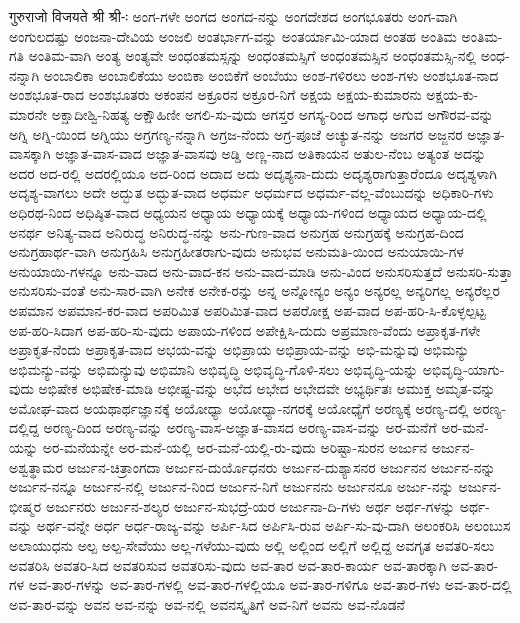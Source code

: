 गुरुराजो
विजयते
श्री
श्री-ः
ಅಂಗ-ಗಳೇ
ಅಂಗದ
ಅಂಗದ-ನನ್ನು
ಅಂಗದೇಶದ
ಅಂಗಭೂತರು
ಅಂಗ-ವಾಗಿ
ಅಂಗುಲದಷ್ಟು
ಅಂಜನಾ-ದೇವಿಯ
ಅಂಜಲಿ
ಅಂತರ್ಭಾಗ-ವನ್ನು
ಅಂತರ್ಯಾಮಿ-ಯಾದ
ಅಂತಹ
ಅಂತಿಮ
ಅಂತಿಮ-ಗತಿ
ಅಂತಿಮ-ವಾಗಿ
ಅಂತ್ಯ
ಅಂತ್ಯವೇ
ಅಂಧಂತಮಸ್ಸನ್ನು
ಅಂಧಂತಮಸ್ಸಿಗೆ
ಅಂಧಂತಮಸ್ಸಿನ
ಅಂಧಂತಮಸ್ಸಿ-ನಲ್ಲಿ
ಅಂಧ-ನನ್ನಾಗಿ
ಅಂಬಾಲಿಕಾ
ಅಂಬಾಲಿಕೆಯು
ಅಂಬಿಕಾ
ಅಂಬಿಕೆಗೆ
ಅಂಬೆಯು
ಅಂಶ-ಗಳಿರಲು
ಅಂಶ-ಗಳು
ಅಂಶಭೂತ-ನಾದ
ಅಂಶಭೂತ-ರಾದ
ಅಂಶಭೂತರು
ಅಕಂಪನ
ಅಕ್ರೂರನ
ಅಕ್ರೂರ-ನಿಗೆ
ಅಕ್ಷಯ
ಅಕ್ಷಯ-ಕುಮಾರನು
ಅಕ್ಷಯ-ಕು-ಮಾರನೇ
ಅಕ್ಷಾದೀಶ್ವಿ-ನಿಹತ್ಯ
ಅಕ್ಷೌಹಿಣೀ
ಅಗಲಿ-ಸು-ವುದು
ಅಗಸ್ತರ
ಅಗಸ್ಯ-ರಿಂದ
ಅಗಾಧ
ಅಗುವ
ಅಗೌರವ-ವನ್ನು
ಅಗ್ನಿ
ಅಗ್ನಿ-ಯಿಂದ
ಅಗ್ನಿಯು
ಅಗ್ರಗಣ್ಯ-ನನ್ನಾಗಿ
ಅಗ್ರಜ-ನೆಂದು
ಅಗ್ರ-ಪೂಜೆ
ಅಚ್ಯುತ-ನನ್ನು
ಅಜಗರ
ಅಜ್ಜನರ
ಅಜ್ಞಾತ-ವಾಸಕ್ಕಾಗಿ
ಅಜ್ಞಾತ-ವಾಸ-ವಾದ
ಅಜ್ಞಾತ-ವಾಸವು
ಅಡ್ಡಿ
ಅಣ್ಣ-ನಾದ
ಅತಿಕಾಯನ
ಅತುಲ-ನೆಂಬ
ಅತ್ಯಂತ
ಅದನ್ನು
ಅದರ
ಅದ-ರಲ್ಲಿ
ಅದರಲ್ಲಿಯೂ
ಅದ-ರಿಂದ
ಅದಾದ
ಅದು
ಅದೃಶ್ಯನಾ-ದುದು
ಅದೃಶ್ಯರಾಗುತ್ತಾರೆಂದೂ
ಅದೃಶ್ಯಳಾಗಿ
ಅದೃಶ್ಯ-ವಾಗಲು
ಅದೇ
ಅದ್ಭುತ
ಅದ್ಭುತ-ವಾದ
ಅಧರ್ಮ
ಅಧರ್ಮದ
ಅಧರ್ಮ-ವಲ್ಲ-ವೆಂಬುದನ್ನು
ಅಧಿಕಾರಿ-ಗಳು
ಅಧಿರಥ-ನಿಂದ
ಅಧಿಷ್ಠಿತ-ವಾದ
ಅಧ್ಯಯನ
ಅಧ್ಯಾಯ
ಅಧ್ಯಾಯಕ್ಕೆ
ಅಧ್ಯಾಯ-ಗಳಿಂದ
ಅಧ್ಯಾಯದ
ಅಧ್ಯಾಯ-ದಲ್ಲಿ
ಅನರ್ಥ
ಅನಿತ್ಯ-ವಾದ
ಅನಿರುದ್ಧ
ಅನಿರುದ್ಧ-ನನ್ನು
ಅನು-ಗುಣ-ವಾದ
ಅನುಗ್ರಹ
ಅನುಗ್ರಹಕ್ಕೆ
ಅನುಗ್ರಹ-ದಿಂದ
ಅನುಗ್ರಹಾರ್ಥ-ವಾಗಿ
ಅನುಗ್ರಹಿಸಿ
ಅನುಗ್ರಹೀತರಾಗು-ವುದು
ಅನುಭವ
ಅನುಮತಿ-ಯಿಂದ
ಅನುಯಾಯಿ-ಗಳ
ಅನುಯಾಯಿ-ಗಳನ್ನೂ
ಅನು-ವಾದ
ಅನು-ವಾದ-ಕನ
ಅನು-ವಾದ-ಮಾಡಿ
ಅನು-ವಿಂದ
ಅನುಸರಿಸುತ್ತದೆ
ಅನುಸರಿ-ಸುತ್ತಾ
ಅನುಸರಿಸು-ವಂತೆ
ಅನು-ಸಾರ-ವಾಗಿ
ಅನೇಕ
ಅನೇಕ-ರನ್ನು
ಅನ್ನ
ಅನ್ನೋನ್ಯಂ
ಅನ್ಯಂ
ಅನ್ಯರಲ್ಲ
ಅನ್ಯರಿಗಲ್ಲ
ಅನ್ಯರೆಲ್ಲರ
ಅಪಮಾನ
ಅಪಮಾನ-ಕರ-ವಾದ
ಅಪರಿಮಿತ
ಅಪರಿಮಿತ-ವಾದ
ಅಪರೋಕ್ಷ
ಅಪ-ವಾದ
ಅಪ-ಹರಿ-ಸಿ-ಕೊಳ್ಳಲ್ಪಟ್ಟ
ಅಪ-ಹರಿ-ಸಿದಾಗ
ಅಪ-ಹರಿ-ಸು-ವುದು
ಅಪಾಯ-ಗಳಿಂದ
ಅಪೇಕ್ಷಿಸಿ-ದುದು
ಅಪ್ರಮಾಣ-ವೆಂದು
ಅಪ್ರಾಕೃತ-ಗಳೇ
ಅಪ್ರಾಕೃತ-ನೆಂದು
ಅಪ್ರಾಕೃತ-ವಾದ
ಅಭಯ-ವನ್ನು
ಅಭಿಪ್ರಾಯ
ಅಭಿಪ್ರಾಯ-ವನ್ನು
ಅಭಿ-ಮನ್ನುವು
ಅಭಿಮನ್ಯು
ಅಭಿಮನ್ಯು-ವನ್ನು
ಅಭಿಮನ್ಯುವು
ಅಭಿಮಾನಿ
ಅಭಿವೃದ್ಧಿ
ಅಭಿವೃದ್ಧಿ-ಗೊಳಿ-ಸಲು
ಅಭಿವೃದ್ಧಿ-ಯನ್ನು
ಅಭಿವೃದ್ಧಿ-ಯಾಗು-ವುದು
ಅಭಿಷೇಕ
ಅಭಿಷೇಕ-ಮಾಡಿ
ಅಭೀಷ್ಟ-ವನ್ನು
ಅಭೆದ
ಅಭೇದ
ಅಭೇದವೇ
ಅಭ್ಯರ್ಥಿತಃ
ಅಮುಕ್ತ
ಅಮೃತ-ವನ್ನು
ಅಮೋಘ-ವಾದ
ಅಯಥಾರ್ಥಜ್ಞಾನಕ್ಕೆ
ಅಯೋಧ್ಯಾ
ಅಯೋಧ್ಯಾ-ನಗರಕ್ಕೆ
ಅಯೋಧ್ಯೆಗೆ
ಅರಣ್ಯಕ್ಕೆ
ಅರಣ್ಯ-ದಲ್ಲಿ
ಅರಣ್ಯ-ದಲ್ಲಿದ್ದ
ಅರಣ್ಯ-ದಿಂದ
ಅರಣ್ಯ-ವನ್ನು
ಅರಣ್ಯ-ವಾಸ-ಅಜ್ಞಾತ-ವಾಸದ
ಅರಣ್ಯ-ವಾಸ-ವನ್ನು
ಅರ-ಮನೆಗೆ
ಅರ-ಮನೆ-ಯನ್ನು
ಅರ-ಮನೆಯನ್ನೇ
ಅರ-ಮನೆ-ಯಲ್ಲಿ
ಅರ-ಮನೆ-ಯಲ್ಲಿ-ರು-ವುದು
ಅರಿಷ್ಟಾ-ಸುರನ
ಅರ್ಜುನ
ಅರ್ಜುನ-ಅಶ್ವತ್ಥಾಮರ
ಅರ್ಜುನ-ಚಿತ್ರಾಂಗದಾ
ಅರ್ಜುನ-ದುರ್ಯೊಧನರು
ಅರ್ಜುನ-ದುಶ್ಯಾಸನರ
ಅರ್ಜುನನ
ಅರ್ಜುನ-ನನ್ನು
ಅರ್ಜುನ-ನನ್ನೂ
ಅರ್ಜುನ-ನಲ್ಲಿ
ಅರ್ಜುನ-ನಿಂದ
ಅರ್ಜುನ-ನಿಗೆ
ಅರ್ಜುನನು
ಅರ್ಜುನನೂ
ಅರ್ಜು-ನನ್ನು
ಅರ್ಜುನ-ಭೀಷ್ಮರ
ಅರ್ಜುನರು
ಅರ್ಜುನ-ಶಲ್ಯರ
ಅರ್ಜುನ-ಸುಭದ್ರೆ-ಯರ
ಅರ್ಜುನಾ-ದಿ-ಗಳು
ಅರ್ಥ
ಅರ್ಥ-ಗಳನ್ನು
ಅರ್ಥ-ವನ್ನು
ಅರ್ಥ-ವನ್ನೇ
ಅರ್ಧ
ಅರ್ಧ-ರಾಜ್ಯ-ವನ್ನು
ಅರ್ಪಿ-ಸಿದ
ಅರ್ಪಿಸಿ-ರುವ
ಅರ್ಪಿ-ಸು-ವು-ದಾಗಿ
ಅಲಂಕರಿಸಿ
ಅಲಂಬುಸ
ಅಲಾಯುಧನು
ಅಲ್ಪ
ಅಲ್ಪ-ಸೇವೆಯು
ಅಲ್ಲ-ಗಳೆಯು-ವುದು
ಅಲ್ಲಿ
ಅಲ್ಲಿಂದ
ಅಲ್ಲಿಗೆ
ಅಲ್ಲಿದ್ದ
ಅವಗೃತ
ಅವತರಿ-ಸಲು
ಅವತರಿಸಿ
ಅವತರಿ-ಸಿದ
ಅವತರಿಸುವ
ಅವತರಿಸು-ವುದು
ಅವ-ತಾರ
ಅವ-ತಾರ-ಕಾರ್ಯ
ಅವ-ತಾರಕ್ಕಾಗಿ
ಅವ-ತಾರ-ಗಳ
ಅವ-ತಾರ-ಗಳನ್ನು
ಅವ-ತಾರ-ಗಳಲ್ಲಿ
ಅವ-ತಾರ-ಗಳಲ್ಲಿಯೂ
ಅವ-ತಾರ-ಗಳಿಗೂ
ಅವ-ತಾರ-ಗಳು
ಅವ-ತಾರ-ದಲ್ಲಿ
ಅವ-ತಾರ-ವನ್ನು
ಅವನ
ಅವ-ನನ್ನು
ಅವ-ನಲ್ಲಿ
ಅವನಸ್ಕೃತಿಗೆ
ಅವ-ನಿಗೆ
ಅವನು
ಅವ-ನೊಡನೆ
